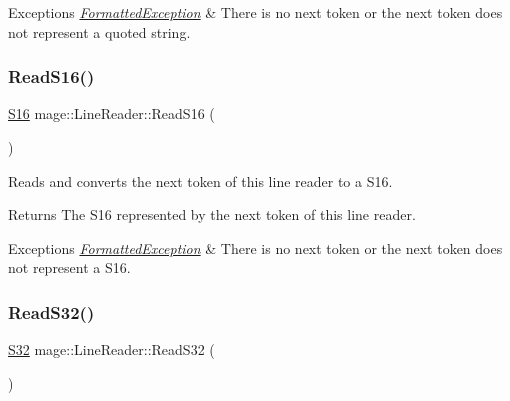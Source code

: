 \begin{DoxyExceptions}{Exceptions}
{\em \hyperlink{classmage_1_1_formatted_exception}{Formatted\+Exception}} & There is no next token or the next token does not represent a quoted string. \\
\hline
\end{DoxyExceptions}
\hypertarget{classmage_1_1_line_reader_a9f3ca4ad3606d9b67a90698c2b71bdd0}{}\label{classmage_1_1_line_reader_a9f3ca4ad3606d9b67a90698c2b71bdd0} 
\subsubsection{\texorpdfstring{Read\+S16()}{ReadS16()}}
{\footnotesize\ttfamily \hyperlink{namespacemage_add9d3fe59b2a338108e98fcd67507005}{S16} mage\+::\+Line\+Reader\+::\+Read\+S16 (\begin{DoxyParamCaption}{ }\end{DoxyParamCaption})\hspace{0.3cm}{\ttfamily [protected]}}

Reads and converts the next token of this line reader to a {\ttfamily S16}.

\begin{DoxyReturn}{Returns}
The {\ttfamily S16} represented by the next token of this line reader. 
\end{DoxyReturn}

\begin{DoxyExceptions}{Exceptions}
{\em \hyperlink{classmage_1_1_formatted_exception}{Formatted\+Exception}} & There is no next token or the next token does not represent a {\ttfamily S16}. \\
\hline
\end{DoxyExceptions}
\hypertarget{classmage_1_1_line_reader_ad3218e41f29c2c3979d1be439835c72d}{}\label{classmage_1_1_line_reader_ad3218e41f29c2c3979d1be439835c72d} 
\subsubsection{\texorpdfstring{Read\+S32()}{ReadS32()}}
{\footnotesize\ttfamily \hyperlink{namespacemage_a642e05c5c83642b6946703615cdbf2da}{S32} mage\+::\+Line\+Reader\+::\+Read\+S32 (\begin{DoxyParamCaption}{ }\end{DoxyParamCaption})\hspace{0.3cm}{\ttfamily [protected]}}


